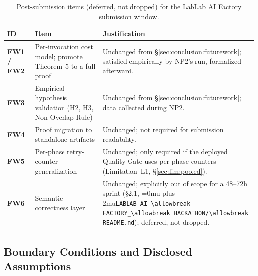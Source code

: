 \documentclass[12pt]{article}
\theoremstyle{definition}
\DeclareRobustCommand{\code}[1]{\begingroup\Urlmuskip=0mu plus 2mu\relax\nolinkurl{#1}\endgroup}
\newcommand{\LabLabFactoryReadme}{\code{LABLAB\_AI\_\allowbreak FACTORY\_\allowbreak HACKATHON/\allowbreak README.md}}
\begin{document}
\begin{table}[H]
\centering
\caption{Post-submission items (deferred, not dropped) for the LabLab
         AI Factory submission window.}
\label{tab:lablab-nextphase-post}
\begin{tabularx}{\linewidth}{@{}>{\bfseries}p{1.6cm} >{\RaggedRight}p{3.6cm} >{\RaggedRight\arraybackslash}X@{}}
\toprule
\textbf{ID} & \textbf{Item} & \textbf{Justification} \\
\midrule
FW1 / FW2 &
  Per-invocation cost model; promote Theorem~5 to a full proof &
  Unchanged from \S\ref{sec:conclusion:futurework}; satisfied
  empirically by NP2's run, formalized afterward. \\[4pt]
FW3 &
  Empirical hypothesis validation (H2, H3, Non-Overlap Rule) &
  Unchanged from \S\ref{sec:conclusion:futurework}; data collected
  during NP2. \\[4pt]
FW4 &
  Proof migration to standalone artifacts &
  Unchanged; not required for submission readability. \\[4pt]
FW5 &
  Per-phase retry-counter generalization &
  Unchanged; only required if the deployed Quality Gate uses per-phase
  counters (Limitation~L1, \S\ref{sec:lim:pooled}). \\[4pt]
FW6 &
  Semantic-correctness layer &
  Unchanged; explicitly out of scope for a 48--72h sprint
  (\S2.1, \LabLabFactoryReadme{}); deferred, not dropped. \\
\bottomrule
\end{tabularx}
\end{table}

\subsection{Boundary Conditions and Disclosed Assumptions}
\label{app:lablab-factory-boundary}
\end{document}
